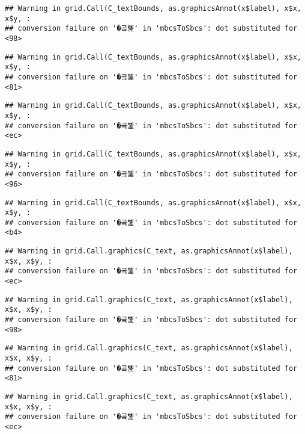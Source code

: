 \documentclass[
]{article}
\begin{document}
\begin{verbatim}
## Warning in grid.Call(C_textBounds, as.graphicsAnnot(x$label), x$x, x$y, :
## conversion failure on '�곸뼱' in 'mbcsToSbcs': dot substituted for <98>
\end{verbatim}

\begin{verbatim}
## Warning in grid.Call(C_textBounds, as.graphicsAnnot(x$label), x$x, x$y, :
## conversion failure on '�곸뼱' in 'mbcsToSbcs': dot substituted for <81>
\end{verbatim}

\begin{verbatim}
## Warning in grid.Call(C_textBounds, as.graphicsAnnot(x$label), x$x, x$y, :
## conversion failure on '�곸뼱' in 'mbcsToSbcs': dot substituted for <ec>
\end{verbatim}

\begin{verbatim}
## Warning in grid.Call(C_textBounds, as.graphicsAnnot(x$label), x$x, x$y, :
## conversion failure on '�곸뼱' in 'mbcsToSbcs': dot substituted for <96>
\end{verbatim}

\begin{verbatim}
## Warning in grid.Call(C_textBounds, as.graphicsAnnot(x$label), x$x, x$y, :
## conversion failure on '�곸뼱' in 'mbcsToSbcs': dot substituted for <b4>
\end{verbatim}

\begin{verbatim}
## Warning in grid.Call.graphics(C_text, as.graphicsAnnot(x$label), x$x, x$y, :
## conversion failure on '�곸뼱' in 'mbcsToSbcs': dot substituted for <ec>
\end{verbatim}

\begin{verbatim}
## Warning in grid.Call.graphics(C_text, as.graphicsAnnot(x$label), x$x, x$y, :
## conversion failure on '�곸뼱' in 'mbcsToSbcs': dot substituted for <98>
\end{verbatim}

\begin{verbatim}
## Warning in grid.Call.graphics(C_text, as.graphicsAnnot(x$label), x$x, x$y, :
## conversion failure on '�곸뼱' in 'mbcsToSbcs': dot substituted for <81>
\end{verbatim}

\begin{verbatim}
## Warning in grid.Call.graphics(C_text, as.graphicsAnnot(x$label), x$x, x$y, :
## conversion failure on '�곸뼱' in 'mbcsToSbcs': dot substituted for <ec>
\end{verbatim}
\end{document}
